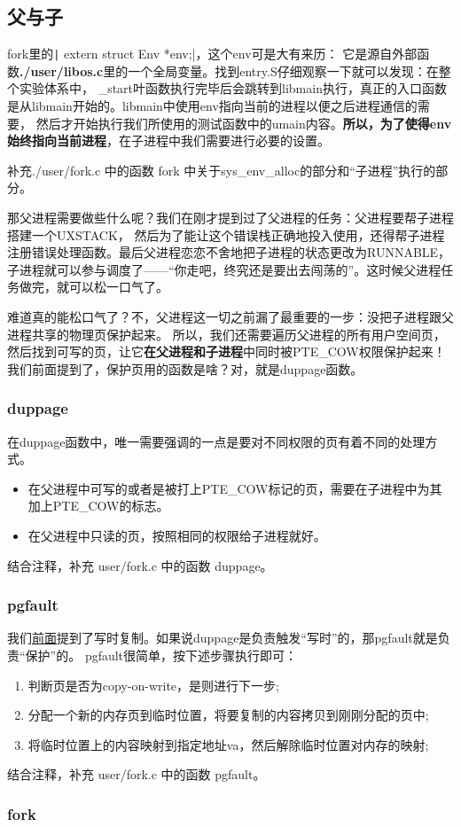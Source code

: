 \subsection{父与子}

fork里的\texttt| extern struct Env *env;|，这个env可是大有来历：
它是源自外部函数\textbf{./user/libos.c}里的一个全局变量。找到entry.S仔细观察一下就可以发现：在整个实验体系中，
\_start叶函数执行完毕后会跳转到libmain执行，真正的入口函数是从libmain开始的。libmain中使用env指向当前的进程以便之后进程通信的需要，
然后才开始执行我们所使用的测试函数中的umain内容。\textbf{所以，为了使得env始终指向当前进程}，在子进程中我们需要进行必要的设置。

\begin{exercise}
 补充./user/fork.c 中的函数 fork 中关于sys\_env\_alloc的部分和“子进程”执行的部分。
\end{exercise}

那父进程需要做些什么呢？我们在刚才提到过了父进程的任务：父进程要帮子进程搭建一个UXSTACK，
然后为了能让这个错误栈正确地投入使用，还得帮子进程注册错误处理函数。最后父进程恋恋不舍地把子进程的状态更改为RUNNABLE，
子进程就可以参与调度了——“你走吧，终究还是要出去闯荡的”。这时候父进程任务做完，就可以松一口气了。

难道真的能松口气了？不，父进程这一切之前漏了最重要的一步：没把子进程跟父进程共享的物理页保护起来。
所以，我们还需要遍历父进程的所有用户空间页，然后找到可写的页，让它\textbf{在父进程和子进程}中同时被PTE\_COW权限保护起来！
我们前面提到了，保护页用的函数是啥？对，就是duppage函数。

\subsubsection{duppage}

在duppage函数中，唯一需要强调的一点是要对不同权限的页有着不同的处理方式。
\begin{itemize}
 \item 在父进程中可写的或者是被打上PTE\_COW标记的页，需要在子进程中为其加上PTE\_COW的标志。
 \item 在父进程中只读的页，按照相同的权限给子进程就好。
\end{itemize}

\begin{exercise}
 结合注释，补充 user/fork.c 中的函数 duppage。
\end{exercise}

\subsubsection{pgfault}
我们\hyperref[页保护与处理]{前面}提到了写时复制。如果说duppage是负责触发“写时”的，那pgfault就是负责“保护”的。
pgfault很简单，按下述步骤执行即可：
\begin{enumerate}
	\item 判断页是否为copy-on-write，是则进行下一步;
	\item 分配一个新的内存页到临时位置，将要复制的内容拷贝到刚刚分配的页中;
	\item 将临时位置上的内容映射到指定地址va，然后解除临时位置对内存的映射;
\end{enumerate}

\begin{exercise}
	结合注释，补充 user/fork.c 中的函数 pgfault。 
\end{exercise}

\subsubsection{fork}
